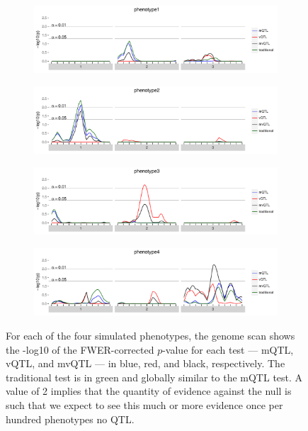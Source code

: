 \begin{figure}
    \begin{subfigure}[b]{\linewidth}
        \includegraphics[width=\textwidth]{images/empir_p_scan_phenotype1.pdf}
    \end{subfigure}

    \begin{subfigure}[b]{\linewidth}
        \includegraphics[width=\textwidth]{images/empir_p_scan_phenotype2.pdf}
    \end{subfigure}

    \begin{subfigure}[b]{\linewidth}
        \includegraphics[width=\textwidth]{images/empir_p_scan_phenotype3.pdf}
    \end{subfigure}

    \begin{subfigure}[b]{\linewidth}
        \includegraphics[width=\textwidth]{images/empir_p_scan_phenotype4.pdf}
    \end{subfigure}

    \caption[
        FWER-corrected $p$-value of each test for each of the four simulated phenotypes.
    ]
    {
        For each of the four simulated phenotypes, the genome scan shows the -log10 of the FWER-corrected $p$-value for each test --- mQTL, vQTL, and mvQTL --- in blue, red, and black, respectively.
        The traditional test is in green and globally similar to the mQTL test.
        A value of 2 implies that the quantity of evidence against the null is such that we expect to see this much or more evidence once per hundred phenotypes no QTL.
    }
    \label{fig:empir_p_scans}
\end{figure}

